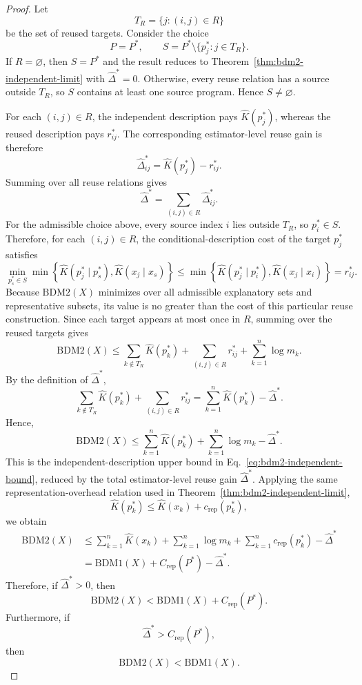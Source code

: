 \documentclass{article}
\begin{document}
\begin{proof}
Let
\[
T_R
=
\{j:(i,j)\in R\}
\]
be the set of reused targets. Consider the choice
\[
P=P^*,
\qquad
S
=
P^*
\setminus
\{p_j^*:j\in T_R\}.
\]
If \(R=\varnothing\), then \(S=P^*\) and the result reduces to Theorem~\ref{thm:bdm2-independent-limit} with \(\hat{\Delta}^*=0\). Otherwise, every reuse relation has a source outside \(T_R\), so \(S\) contains at least one source program. Hence \(S\neq\varnothing\).

For each \((i,j)\in R\), the independent description pays \(\hat K(p_j^*)\), whereas the reused description pays \(r_{ij}^*\). The corresponding estimator-level reuse gain is therefore
\[
\hat{\Delta}_{ij}^*
=
\hat K(p_j^*)-r_{ij}^*.
\]
Summing over all reuse relations gives
\[
\hat{\Delta}^*
=
\sum_{(i,j)\in R}
\hat{\Delta}_{ij}^*.
\]
For the admissible choice above, every source index \(i\) lies outside \(T_R\), so \(p_i^*\in S\). Therefore, for each \((i,j)\in R\), the conditional-description cost of the target \(p_j^*\) satisfies
\[
\min_{p_s^*\in S}
\min
\left\{
\hat K(p_j^*\mid p_s^*),
\hat K(x_j\mid x_s)
\right\}
\leq
\min
\left\{
\hat K(p_j^*\mid p_i^*),
\hat K(x_j\mid x_i)
\right\}
=
r_{ij}^*.
\]
Because \(\mathrm{BDM2}(X)\) minimizes over all admissible explanatory sets and representative subsets, its value is no greater than the cost of this particular reuse construction. Since each target appears at most once in \(R\), summing over the reused targets gives
\[
\mathrm{BDM2}(X)
\leq
\sum_{k\notin T_R}\hat K(p_k^*)
+
\sum_{(i,j)\in R}r_{ij}^*
+
\sum_{k=1}^{n}\log m_k.
\]
By the definition of \(\hat{\Delta}^*\),
\[
\sum_{k\notin T_R}\hat K(p_k^*)
+
\sum_{(i,j)\in R}r_{ij}^*
=
\sum_{k=1}^{n}\hat K(p_k^*)
-
\hat{\Delta}^*.
\]
Hence,
\[
\mathrm{BDM2}(X)
\leq
\sum_{k=1}^{n}\hat K(p_k^*)
+
\sum_{k=1}^{n}\log m_k
-
\hat{\Delta}^*.
\]
This is the independent-description upper bound in Eq.~\eqref{eq:bdm2-independent-bound}, reduced by the total estimator-level reuse gain \(\hat{\Delta}^*\). Applying the same representation-overhead relation used in Theorem~\ref{thm:bdm2-independent-limit},
\[
\hat K(p_k^*)
\leq
\hat K(x_k)
+
c_{\mathrm{rep}}(p_k^*),
\]
we obtain
\[
\begin{aligned}
\mathrm{BDM2}(X)
&\leq
\sum_{k=1}^{n}\hat K(x_k)
+
\sum_{k=1}^{n}\log m_k
+
\sum_{k=1}^{n}c_{\mathrm{rep}}(p_k^*)
-
\hat{\Delta}^* \\
&=
\mathrm{BDM1}(X)
+
C_{\mathrm{rep}}(P^*)
-
\hat{\Delta}^*.
\end{aligned}
\]
Therefore, if \(\hat{\Delta}^*>0\), then
\[
\mathrm{BDM2}(X)
<
\mathrm{BDM1}(X)
+
C_{\mathrm{rep}}(P^*).
\]
Furthermore, if
\[
\hat{\Delta}^*
>
C_{\mathrm{rep}}(P^*),
\]
then
\[
\mathrm{BDM2}(X)
<
\mathrm{BDM1}(X).
\]
\end{proof}
\end{document}
